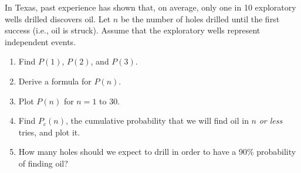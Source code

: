 \begin{problem}
In Texas, past experience has shown that, on average, only one in 10 exploratory wells drilled discovers oil.
Let $n$ be the number of holes drilled until the first success (i.e., oil is struck).  Assume that
the exploratory wells represent independent events.
\begin{enumerate}[label=\alph*)]
\item Find $P(1)$, $P(2)$, and $P(3)$.
\item Derive a formula for $P(n)$.
\item Plot $P(n)$ for $n = 1$ to $30$.
\item Find $P_c(n)$, the cumulative probability that we will
find oil in $n$ \emph{or less} tries, and plot it.
\item How many holes should we expect to drill
in order to have a 90\%  probability of finding oil?
\end{enumerate}
\end{problem}
